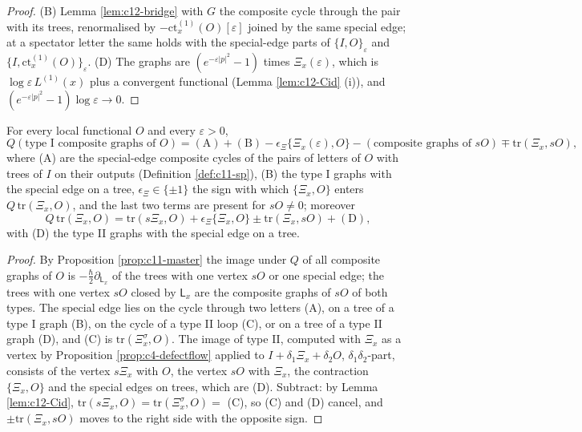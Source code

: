\begin{proof}
(B) Lemma \ref{lem:c12-bridge} with $G$ the composite cycle through the pair with its trees, renormalised by $-\mathrm{ct}^{(1)}_x(O)[\varepsilon]$ joined by the same special edge; at a spectator letter the same holds with the special-edge parts of $\{I,O\}_\varepsilon$ and $\{I,\mathrm{ct}^{(1)}_x(O)\}_\varepsilon$. (D) The graphs are $(e^{-\varepsilon|p|^2}-1)$ times $\Xi_x(\varepsilon)$, which is $\log\varepsilon\,L^{(1)}(x)$ plus a convergent functional (Lemma \ref{lem:c12-Cid} (i)), and $(e^{-\varepsilon|p|^2}-1)\log\varepsilon\to0$.
\end{proof}

\begin{proposition}
\label{prop:c12-typeI}
For every local functional $O$ and every $\varepsilon>0$,
\[
Q(\text{type I composite graphs of }O)=(\mathrm A)+(\mathrm B)-\epsilon_\Xi\{\Xi_x(\varepsilon),O\}-(\text{composite graphs of }sO)\mp\mathrm{tr}(\Xi_x,sO),
\]
where (A) are the special-edge composite cycles of the pairs of letters of $O$ with trees of $I$ on their outputs (Definition \ref{def:c11-sp}), (B) the type I graphs with the special edge on a tree, $\epsilon_\Xi\in\{\pm1\}$ the sign with which $\{\Xi_x,O\}$ enters $Q\,\mathrm{tr}(\Xi_x,O)$, and the last two terms are present for $sO\neq0$; moreover
\[
Q\,\mathrm{tr}(\Xi_x,O)=\mathrm{tr}(s\Xi_x,O)+\epsilon_\Xi\{\Xi_x,O\}\pm\mathrm{tr}(\Xi_x,sO)+(\mathrm D),
\]
with (D) the type II graphs with the special edge on a tree.
\end{proposition}

\begin{proof}
By Proposition \ref{prop:c11-master} the image under $Q$ of all composite graphs of $O$ is $-\tfrac\hbar2\partial_{\mathsf L_x}$ of the trees with one vertex $sO$ or one special edge; the trees with one vertex $sO$ closed by $\mathsf L_x$ are the composite graphs of $sO$ of both types. The special edge lies on the cycle through two letters (A), on a tree of a type I graph (B), on the cycle of a type II loop (C), or on a tree of a type II graph (D), and (C) is $\mathrm{tr}(\Xi^\sigma_x,O)$. The image of type II, computed with $\Xi_x$ as a vertex by Proposition \ref{prop:c4-defectflow} applied to $I+\delta_1\Xi_x+\delta_2O$, $\delta_1\delta_2$-part, consists of the vertex $s\Xi_x$ with $O$, the vertex $sO$ with $\Xi_x$, the contraction $\{\Xi_x,O\}$ and the special edges on trees, which are (D). Subtract: by Lemma \ref{lem:c12-Cid}, $\mathrm{tr}(s\Xi_x,O)=\mathrm{tr}(\Xi^\sigma_x,O)=$ (C), so (C) and (D) cancel, and $\pm\mathrm{tr}(\Xi_x,sO)$ moves to the right side with the opposite sign.
\end{proof}

